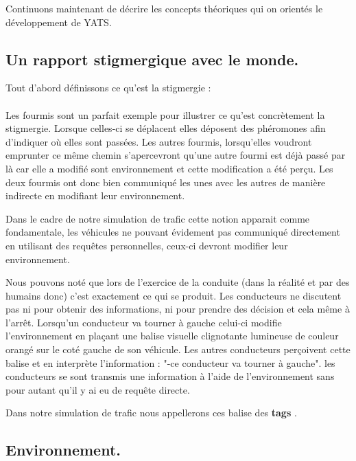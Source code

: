 \documentclass[a4paper,11pt]{article}
\begin{document}
Continuons maintenant de décrire les concepts théoriques qui on orientés le développement de YATS.

\subsection{Un rapport stigmergique avec le monde.}

Tout d'abord définissons ce qu'est la stigmergie :\\

\\

Les fourmis sont un parfait exemple pour illustrer ce qu'est concrètement la stigmergie. Lorsque celles-ci se déplacent elles déposent des phéromones afin d'indiquer où elles sont passées. Les autres fourmis, lorsqu'elles voudront emprunter ce même chemin s'apercevront qu'une autre fourmi est déjà passé par là car elle a modifié sont environnement et cette modification a été perçu. Les deux fourmis ont donc bien communiqué les unes avec les autres de manière indirecte en modifiant leur environnement. 

Dans le cadre de notre simulation de trafic cette notion apparait comme fondamentale, les véhicules ne pouvant évidement pas communiqué directement en utilisant des requêtes personnelles, ceux-ci devront modifier leur environnement.

Nous pouvons noté que lors de l'exercice de la conduite (dans la réalité et par des humains donc) c'est exactement ce qui se produit. Les conducteurs ne discutent pas ni pour obtenir des informations, ni pour prendre des décision et cela même à l'arrêt. Lorsqu'un conducteur va tourner à gauche celui-ci modifie l'environnement en plaçant une balise visuelle clignotante lumineuse de couleur orangé sur le  coté gauche de son véhicule. Les autres conducteurs perçoivent cette balise et en interprète l'information : "-ce conducteur va tourner à gauche". les conducteurs se sont transmis une information à l'aide de l'environnement sans pour autant qu'il y ai eu de requête directe.

Dans notre simulation de trafic nous appellerons ces balise des \textbf{tags} \cite{Platon2005}.

\subsection{Environnement.}
\end{document}
